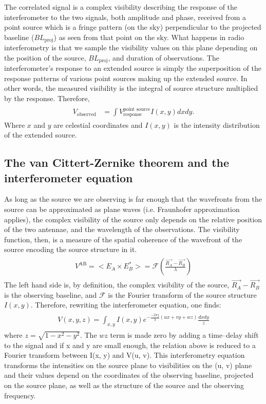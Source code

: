 \documentclass[a4wide,12pt]{book}
\begin{document}
{The correlated signal is a complex visibility describing the response of the interferometer to the two signals, both amplitude and phase, received from a point source which is a fringe pattern (on the sky) perpendicular to the projected baseline ($BL_\mathrm{proj}$) as seen from that point on the sky. What happens in radio interferometry is that we sample the visibility values on this plane depending on the position of the source, $BL_\mathrm{proj}$, and duration of observations. The interferometer's response to an extended source is simply the superposition of the response patterns of various point sources making up the extended source. In other words, the measured visibility is the integral of source structure multiplied by the response. Therefore,
\begin{align} 
\begin{split}
V_\mathrm{observed} &= \int V^\text{point source}_\text{response} I(x, y) dx dy.
\end{split}                    
\end{align}
Where $x$ and $y$ are celestial coordinates and $I(x, y)$ is the intensity distribution of the extended source.

\subsection*{The van Cittert-Zernike theorem and the interferometer equation}
As long as the source we are observing is far enough that the wavefronts from the source can be approximated as plane waves (i.e. Fraunhofer approximation applies), the complex visibility of the source only depends on the relative position of the two antennae, and the wavelength of the observations. The visibility function, then, is a measure of the spatial coherence of the wavefront of the source encoding the source structure in it.
\begin{align} 
\begin{split}
\label{eq:vC-Z}
V^\mathrm{AB} = <E_A \times E_B^*> = \mathcal{F}(\frac{\vec{R_A} - \vec{R_B}}{\lambda})
\end{split}                    
\end{align}
The left hand side is, by definition, the complex visibility of the source, $\vec{R_A} - \vec{R_B}$ is the observing baseline, and $\mathcal{F}$ is the Fourier transform of the source structure $I(x, y)$. Therefore, rewriting the interferometer equation, one finds:
\begin{align} 
\begin{split}
\label{eq:InterferometerEq}
V(x,y,z) = \int_{x,y} I(x, y) e^{-\frac{-2\pi j}{\lambda}(ux+vy+wz)} \frac{dx dy}{z}
\end{split}                    
\end{align}
where $z=\sqrt{1-x^2-y^2}$. The $wz$ term is made zero by adding a time--delay shift to the signal and if x and y are small enough, the relation above is reduced to a Fourier transform between I(x, y) and V(u, v). This interferometry equation transforms the intensities on the source plane to visibilities on the (u, v) plane and their values depend on the coordinates of the observing baseline, projected on the source plane, as well as the structure of the source and the observing frequency. 

}
\end{document}
